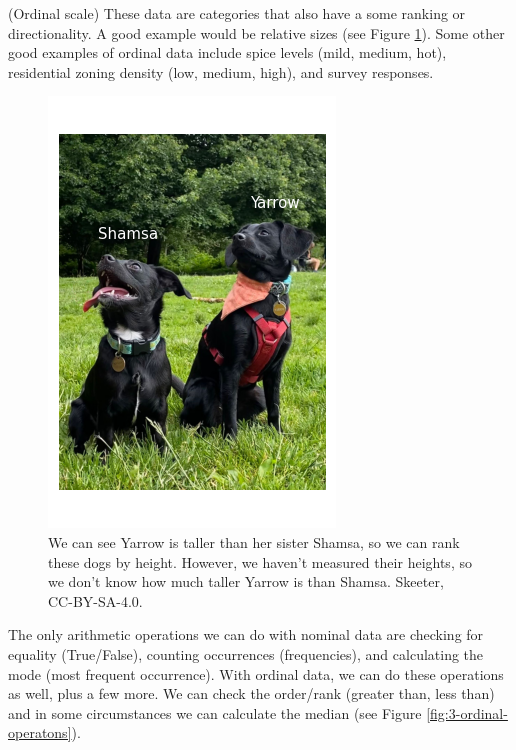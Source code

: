 \documentclass[
]{book}
\begin{document}
(Ordinal scale) These data are categories that also have a some ranking or directionality. A good example would be relative sizes (see Figure \ref{fig:3-dogs-ordinal}). Some other good examples of ordinal data include spice levels (mild, medium, hot), residential zoning density (low, medium, high), and survey responses.

\begin{figure}
\includegraphics[width=0.75\linewidth]{images/03-dogs-ordinal} \caption{We can see Yarrow is taller than her sister Shamsa, so we can rank these dogs by height.  However, we haven't measured their heights, so we don't know how much taller Yarrow is than Shamsa. Skeeter, CC-BY-SA-4.0.}\label{fig:3-dogs-ordinal}
\end{figure}

The only arithmetic operations we can do with nominal data are checking for equality (True/False), counting occurrences (frequencies), and calculating the mode (most frequent occurrence). With ordinal data, we can do these operations as well, plus a few more. We can check the order/rank (greater than, less than) and in some circumstances we can calculate the median (see Figure \ref{fig:3-ordinal-operatons}).
\end{document}
